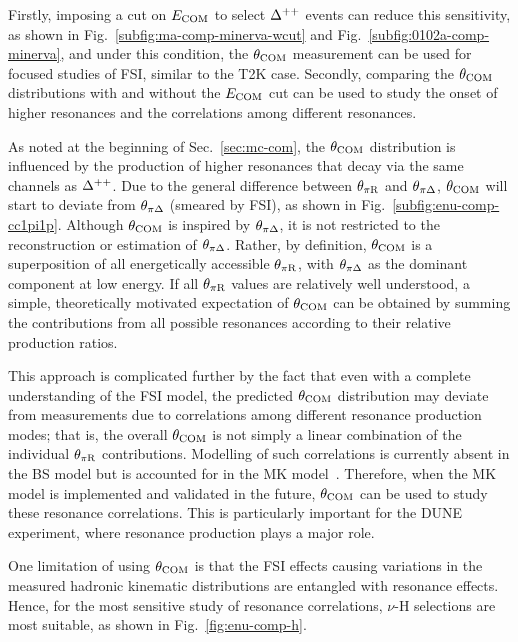      Firstly, imposing a cut on $E_{\textrm{COM}}$ to select $\Delta^{++}$ events can reduce this sensitivity, as shown in Fig.~\ref{subfig:ma-comp-minerva-wcut} and Fig.~\ref{subfig:0102a-comp-minerva}, and under this condition, the $\theta_{\textrm{COM}}$ measurement can be used for focused studies of FSI, similar to the T2K case.
     Secondly, comparing the $\theta_{\textrm{COM}}$ distributions with and without the $E_{\textrm{COM}}$ cut can be used to study the onset of higher resonances and the correlations among different resonances.

     As noted at the beginning of Sec.~\ref{sec:mc-com}, the $\theta_{\textrm{COM}}$ distribution is influenced by the production of higher resonances that decay via the same channels as $\Delta^{++}$.
     Due to the general difference between $\theta_{\pi\textrm{R}}$ and $\theta_{\pi\Delta}$, $\theta_{\textrm{COM}}$ will start to deviate from $\theta_{\pi\Delta}$ (smeared by FSI), as shown in Fig.~\ref{subfig:enu-comp-cc1pi1p}.
     Although $\theta_{\textrm{COM}}$ is inspired by $\theta_{\pi\Delta}$, it is not restricted to the reconstruction or estimation of $\theta_{\pi\Delta}$. 
     Rather, by definition, $\theta_{\textrm{COM}}$ is a superposition of all energetically accessible $\theta_{\pi\textrm{R}}$, with $\theta_{\pi\Delta}$ as the dominant component at low energy.
     If all $\theta_{\pi\textrm{R}}$ values are relatively well understood, a simple, theoretically motivated expectation of $\theta_{\textrm{COM}}$ can be obtained by summing the contributions from all possible resonances according to their relative production ratios.

     This approach is complicated further by the fact that even with a complete understanding of the FSI model, the predicted $\theta_{\textrm{COM}}$ distribution may deviate from measurements due to correlations among different resonance production modes; that is, the overall $\theta_{\textrm{COM}}$ is not simply a linear combination of the individual $\theta_{\pi\textrm{R}}$ contributions.
     Modelling of such correlations is currently absent in the BS model but is accounted for in the MK model~\cite{Kabirnezhad:2017jmf,Kabirnezhad:2020wtp,Kabirnezhad:2022znc}.
     Therefore, when the MK model is implemented and validated in the future, $\theta_{\textrm{COM}}$ can be used to study these resonance correlations.
     This is particularly important for the DUNE experiment, where resonance production plays a major role.

     One limitation of using $\theta_{\textrm{COM}}$ is that the FSI effects causing variations in the measured hadronic kinematic distributions are entangled with resonance effects.
     Hence, for the most sensitive study of resonance correlations, $\nu$-H selections are most suitable, as shown in Fig.~\ref{fig:enu-comp-h}.

